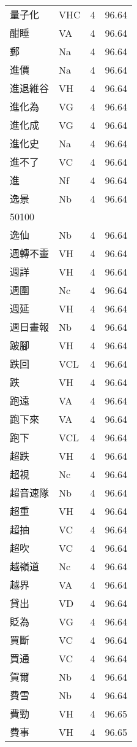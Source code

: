 \documentclass[twocolumn]{book}
\begin{document}
\begin{supertabular}{llrr}
量子化 & VHC & 4 &  96.64\\
酣睡 & VA & 4 &  96.64\\
郵 & Na & 4 &  96.64\\
進價 & Na & 4 &  96.64\\
進退維谷 & VH & 4 &  96.64\\
進化為 & VG & 4 &  96.64\\
進化成 & VG & 4 &  96.64\\
進化史 & Na & 4 &  96.64\\
進不了 & VC & 4 &  96.64\\
進 & Nf & 4 &  96.64\\
逸景 & Nb & 4 &  96.64\\
50100\\
逸仙 & Nb & 4 &  96.64\\
週轉不靈 & VH & 4 &  96.64\\
週詳 & VH & 4 &  96.64\\
週圍 & Nc & 4 &  96.64\\
週延 & VH & 4 &  96.64\\
週日畫報 & Nb & 4 &  96.64\\
跛腳 & VH & 4 &  96.64\\
跌回 & VCL & 4 &  96.64\\
跌 & VH & 4 &  96.64\\
跑遠 & VA & 4 &  96.64\\
跑下來 & VA & 4 &  96.64\\
跑下 & VCL & 4 &  96.64\\
超跌 & VH & 4 &  96.64\\
超視 & Nc & 4 &  96.64\\
超音速隊 & Nb & 4 &  96.64\\
超重 & VH & 4 &  96.64\\
超抽 & VC & 4 &  96.64\\
超吹 & VC & 4 &  96.64\\
越嶺道 & Nc & 4 &  96.64\\
越界 & VA & 4 &  96.64\\
貸出 & VD & 4 &  96.64\\
貶為 & VG & 4 &  96.64\\
買斷 & VC & 4 &  96.64\\
買通 & VC & 4 &  96.64\\
賀爾 & Nb & 4 &  96.64\\
費雪 & Nb & 4 &  96.64\\
費勁 & VH & 4 &  96.65\\
費事 & VH & 4 &  96.65\\

\end{supertabular}
\end{document}
